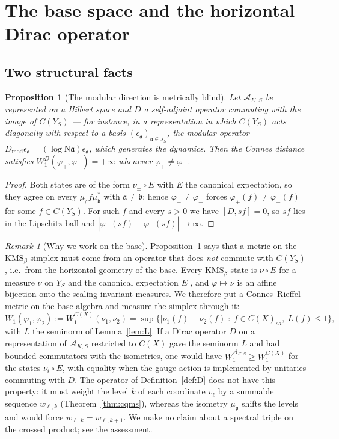 \documentclass[11pt]{amsart}
\numberwithin{equation}{section}
\newtheorem{proposition}[theorem]{Proposition}
\theoremstyle{definition}
\theoremstyle{remark}
\newtheorem{remark}[theorem]{Remark}
\newcommand{\cA}{\mathcal{A}}
\newcommand{\pp}{\mathfrak{p}}
\newcommand{\aaa}{\mathfrak{a}}
\newcommand{\bb}{\mathfrak{b}}
\newcommand{\Ns}{\mathrm{N}}
\newcommand{\Dm}{D_{\mathrm{mod}}}
\begin{document}
\section{The base space and the horizontal Dirac operator}

\subsection{Two structural facts}

\begin{proposition}[The modular direction is metrically blind]\label{prop:blind}
Let $\cA_{K,S}$ be represented on a Hilbert space and $D$ a self-adjoint operator commuting
with the image of $C(Y_S)$ --- for instance, in a representation in which $C(Y_S)$ acts
diagonally with respect to a basis $(\epsilon_\aaa)_{\aaa\in J_S}$, the modular operator
$\Dm\epsilon_\aaa=(\log\Ns\aaa)\epsilon_\aaa$, which generates the dynamics. Then the
Connes distance \cite{Connes89,ConnesBook} satisfies
$W_1^{D}(\varphi_+,\varphi_-)=+\infty$ whenever $\varphi_+\ne\varphi_-$.
\end{proposition}

\begin{proof}
Both states are of the form $\nu_\pm\circ E$ with $E$ the canonical expectation, so they
agree on every $\mu_\aaa f\mu_\bb^*$ with $\aaa\ne\bb$; hence $\varphi_+\ne\varphi_-$ forces
$\varphi_+(f)\ne\varphi_-(f)$ for some $f\in C(Y_S)$. For such $f$ and every $s>0$ we have
$[D,sf]=0$, so $sf$ lies in the Lipschitz ball and
$|\varphi_+(sf)-\varphi_-(sf)|\to\infty$.
\end{proof}

\begin{remark}[Why we work on the base]\label{prop:reduction}
Proposition~\ref{prop:blind} says that a metric on the $\mathrm{KMS}_\beta$ simplex must
come from an operator that does \emph{not} commute with $C(Y_S)$, i.e.\ from the horizontal
geometry of the base. Every $\mathrm{KMS}_\beta$ state is $\nu\circ E$ for a measure $\nu$ on
$Y_S$ and the canonical expectation $E$ \cite[Prop.~2.8]{Main}, and $\varphi\mapsto\nu$ is an
affine bijection onto the scaling-invariant measures. We therefore put a Connes--Rieffel
metric on the base algebra and measure the simplex through it:
\[
W_1(\varphi_1,\varphi_2):=W_1^{C(X)}(\nu_1,\nu_2)
=\sup\bigl\{|\nu_1(f)-\nu_2(f)|:\ f\in C(X)_{sa},\ L(f)\le1\bigr\},
\]
with $L$ the seminorm of Lemma~\ref{lem:L}. If a Dirac operator $D$ on a representation of
$\cA_{K,S}$ restricted to $C(X)$ gave the seminorm $L$ and had bounded commutators with
the isometries, one would have $W_1^{\cA_{K,S}}\ge W_1^{C(X)}$ for the states $\nu_i\circ E$,
with equality when the gauge action is implemented by unitaries commuting with $D$. The
operator of Definition~\ref{def:D} does not have this property: it must weight the level
$k$ of each coordinate $v_\ell$ by a summable sequence $w_{\ell,k}$ (Theorem~\ref{thm:cqms}),
whereas the isometry $\mu_\pp$ shifts the levels and would force $w_{\ell,k}=w_{\ell,k+1}$.
We make no claim about a spectral triple on the crossed product; see the assessment.
\end{remark}
\end{document}
